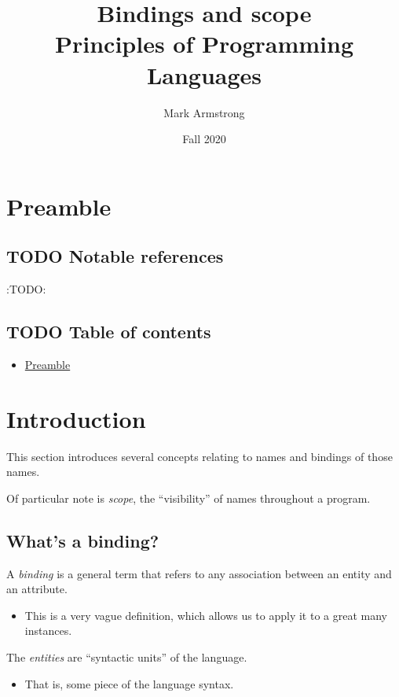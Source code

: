 \documentclass[11pt]{article}
\author{Mark Armstrong}
\date{Fall 2020}
\title{Bindings and scope\\\medskip
\large Principles of Programming Languages}
\theoremstyle{definition}
\begin{document}
\maketitle

\section{Preamble}
\label{sec:orgaef609c}

\subsection{{\bfseries\sffamily TODO} Notable references}
\label{sec:org2fc4a77}

:TODO:

\subsection{{\bfseries\sffamily TODO} Table of contents}
\label{sec:org04a8596}

\begin{scriptsize}
\begin{itemize}
\item \hyperref[sec:orgaef609c]{Preamble}
\end{itemize}
\end{scriptsize}

\section{Introduction}
\label{sec:org7bc3d93}

This section introduces several concepts
relating to names and bindings of those names.

Of particular note is \emph{scope}, the “visibility” of names
throughout a program.

\subsection{What's a binding?}
\label{sec:orgb5cf801}

A \emph{binding} is a general term that refers
to any association between an entity and an attribute.
\begin{itemize}
\item This is a very vague definition, which allows us to apply it
to a great many instances.
\end{itemize}

The \emph{entities} are “syntactic units” of the language.
\begin{itemize}
\item That is, some piece of the language syntax.
\end{itemize}
\end{document}
